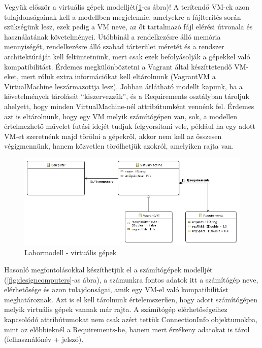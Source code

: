 Vegyük először a virtuális gépek modelljét(\ref{fig:designvm}-es ábra)! A terítendő VM-ek azon tulajdonságainak kell a modellben megjelennie, amelyekre a fájlterítés során szükségünk lesz, ezek pedig a VM neve, az őt tartalmazó fájl elérési útvonala és használatának követelményei. Utóbbinál a rendelkezésre álló memória mennyiségét, rendelkezésre álló szabad tárterület méretét és a rendszer architektúráját kell feltüntetnünk, mert csak ezek befolyásolják a gépekkel való kompatibilitást. Érdemes megkülönböztetni a Vagrant által készíttetendő VM-eket, mert róluk extra információkat kell eltárolnunk (VagrantVM a VirtualMachine leszármazottja lesz). Jobban átlátható modellt kapunk, ha a követelmények tárolását ``kiszervezzük'', és a Requirements osztályban tároljuk ahelyett, hogy minden VirtualMachine-nél attribútumként vennénk fel. Érdemes azt is eltárolnunk, hogy egy VM melyik számítógépen van, sok, a modellen értelmezhető művelet futási idejét tudjuk felgyorsítani vele, például ha egy adott VM-et szeretnénk majd törölni a gépekről, akkor nem kell az összesen végigmennünk, hanem közvetlen törölhetjük azokról, amelyiken rajta van.

\begin{figure}[ht]
	\centering
	\includegraphics[width=130mm, keepaspectratio]{figures/design_vm.png}
	\caption{Labormodell - virtuális gépek}
	\label{fig:designvm}
\end{figure}

Hasonló megfontolásokkal készíthetjük el a számítógépek modelljét (\ref{fig:designcomputers}-as ábra), a számunkra fontos adatok itt a számítógép neve, elérhetősége és azon tulajdonságai, amik egy VM-el való kompatibilitást meghatároznak. Azt is el kell tárolnunk értelemszerűen, hogy adott számítógépen melyik virtuális gépek vannak már rajta. A számítógép elérhetőségeihez kapcsolódó attribútumokat nem csak azért tettük ConnectionInfo objektumokba, mint az előbbieknél a Requirements-be, hanem mert érzékeny adatokat is tárol (felhasználónév + jelszó).

